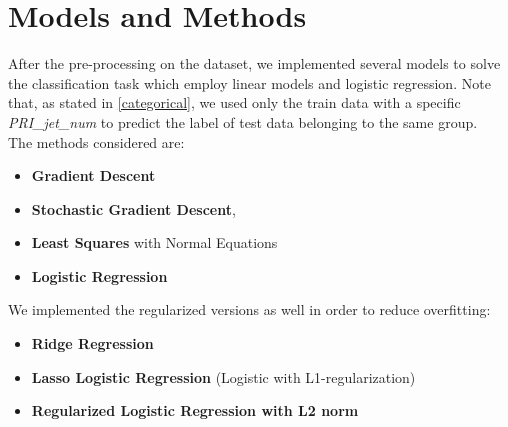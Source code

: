 \documentclass[10pt,conference,compsocconf]{IEEEtran}
\begin{document}
\section{Models and Methods}
\label{models}
After the pre-processing on the dataset, we implemented several models to solve the classification task which employ linear models and logistic regression.
Note that, as stated in \ref{categorical}, we used only the train data with a specific \emph{PRI\_jet\_num} to predict the label of test data belonging to the same group. \\
The methods considered are:
\begin{itemize}
    \item \textbf{Gradient Descent}
    \item \textbf{Stochastic Gradient Descent}, 
    \item \textbf{Least Squares} with Normal Equations
    \item \textbf{Logistic Regression}
    \end{itemize}
We implemented the regularized versions as well in order to reduce overfitting:
\begin{itemize}
\item \textbf{Ridge Regression}
\item \textbf{Lasso Logistic Regression} (Logistic with L1-regularization)
\item \textbf{Regularized Logistic Regression with L2 norm}
\end{itemize}
\end{document}
